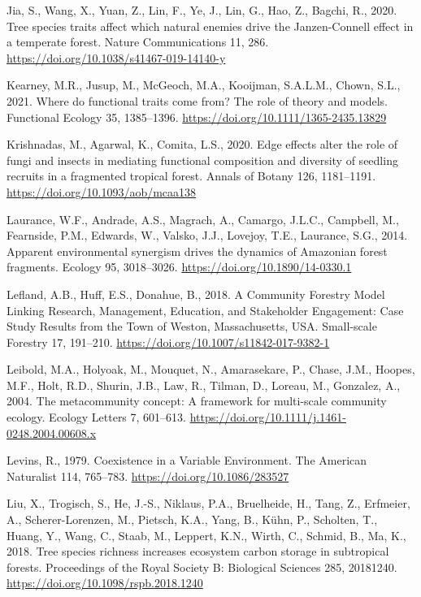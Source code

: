 \documentclass[
  12pt,
]{article}
\newlength{\cslhangindent}
\newlength{\cslentryspacingunit} %
\newenvironment{CSLReferences}[2] %
 {%
  \setlength{\parindent}{0pt}
  \ifodd #1
  \let\oldpar\par
  \def\par{\hangindent=\cslhangindent\oldpar}
  \fi
  \setlength{\parskip}{#2\cslentryspacingunit}
 }%
 {}
\begin{document}
\begin{CSLReferences}{1}{0}
\leavevmode{}%
Jia, S., Wang, X., Yuan, Z., Lin, F., Ye, J., Lin, G., Hao, Z., Bagchi, R., 2020. Tree species traits affect which natural enemies drive the {Janzen-Connell} effect in a temperate forest. Nature Communications 11, 286. \url{https://doi.org/10.1038/s41467-019-14140-y}

\leavevmode{}%
Kearney, M.R., Jusup, M., McGeoch, M.A., Kooijman, S.A.L.M., Chown, S.L., 2021. Where do functional traits come from? {The} role of theory and models. Functional Ecology 35, 1385--1396. \url{https://doi.org/10.1111/1365-2435.13829}

\leavevmode{}%
Krishnadas, M., Agarwal, K., Comita, L.S., 2020. Edge effects alter the role of fungi and insects in mediating functional composition and diversity of seedling recruits in a fragmented tropical forest. Annals of Botany 126, 1181--1191. \url{https://doi.org/10.1093/aob/mcaa138}

\leavevmode{}%
Laurance, W.F., Andrade, A.S., Magrach, A., Camargo, J.L.C., Campbell, M., Fearnside, P.M., Edwards, W., Valsko, J.J., Lovejoy, T.E., Laurance, S.G., 2014. Apparent environmental synergism drives the dynamics of {Amazonian} forest fragments. Ecology 95, 3018--3026. \url{https://doi.org/10.1890/14-0330.1}

\leavevmode{}%
Lefland, A.B., Huff, E.S., Donahue, B., 2018. A {Community Forestry Model Linking Research}, {Management}, {Education}, and {Stakeholder Engagement}: {Case Study Results} from the {Town} of {Weston}, {Massachusetts}, {USA}. Small-scale Forestry 17, 191--210. \url{https://doi.org/10.1007/s11842-017-9382-1}

\leavevmode{}%
Leibold, M.A., Holyoak, M., Mouquet, N., Amarasekare, P., Chase, J.M., Hoopes, M.F., Holt, R.D., Shurin, J.B., Law, R., Tilman, D., Loreau, M., Gonzalez, A., 2004. The metacommunity concept: {A} framework for multi-scale community ecology. Ecology Letters 7, 601--613. \url{https://doi.org/10.1111/j.1461-0248.2004.00608.x}

\leavevmode{}%
Levins, R., 1979. Coexistence in a {Variable Environment}. The American Naturalist 114, 765--783. \url{https://doi.org/10.1086/283527}

\leavevmode{}%
Liu, X., Trogisch, S., He, J.-S., Niklaus, P.A., Bruelheide, H., Tang, Z., Erfmeier, A., Scherer-Lorenzen, M., Pietsch, K.A., Yang, B., Kühn, P., Scholten, T., Huang, Y., Wang, C., Staab, M., Leppert, K.N., Wirth, C., Schmid, B., Ma, K., 2018. Tree species richness increases ecosystem carbon storage in subtropical forests. Proceedings of the Royal Society B: Biological Sciences 285, 20181240. \url{https://doi.org/10.1098/rspb.2018.1240}


\end{CSLReferences}
\end{document}
